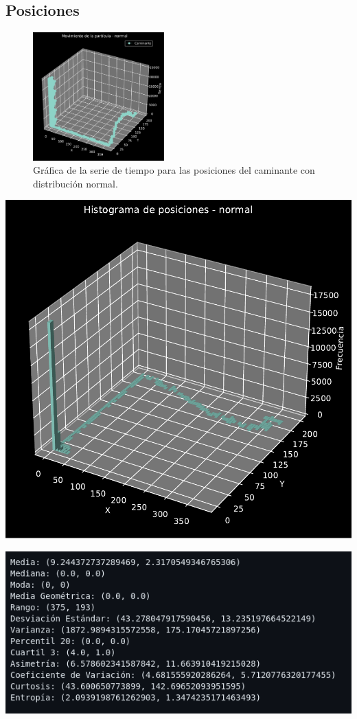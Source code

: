 \documentclass[11pt]{article} %
\begin{document}
	 
	 \subsection{Posiciones}
	 \begin{figure}[h]
	 	\centering
	 	\includegraphics[width=0.45\textwidth]{graf_posiciones_normal.pdf}
	 	\caption{Gráfica de la serie de tiempo para las posiciones del caminante con distribución normal.}
	 	\label{fig:posNormalGraf}
	 \end{figure}
	 \begin{multicols}{2}
	 	\begin{minipage}{\linewidth}
	 		\centering
	 		\includegraphics[width=0.8\linewidth]{hist_posiciones_normal.pdf}
	 		\label{fig:posNormalHist}
	 	\end{minipage}
	 	\vfill\columnbreak
	 	\begin{minipage}{\linewidth}
	 		\centering
	 		\includegraphics[width=1\linewidth]{n3.png}%
	 		\label{posNormalMet}
	 	\end{minipage}
	 \end{multicols}
\end{document}
